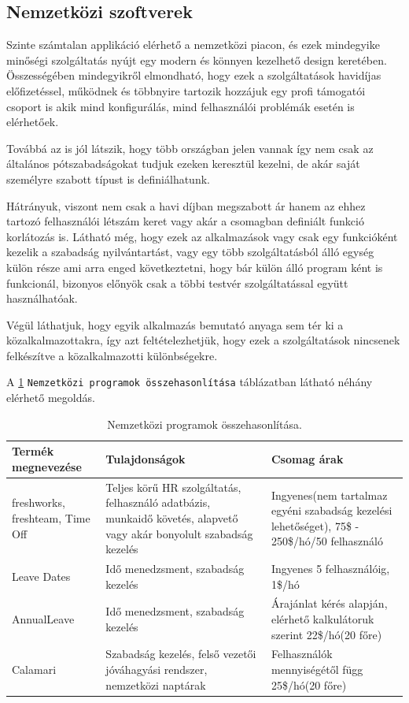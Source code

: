 \subsection{Nemzetközi szoftverek}

Szinte számtalan applikáció elérhető a nemzetközi piacon, és ezek mindegyike minőségi szolgáltatás nyújt egy modern és könnyen kezelhető design keretében. Összességében mindegyikről elmondható, hogy ezek a szolgáltatások havidíjas előfizetéssel, működnek és többnyire tartozik hozzájuk egy profi támogatói csoport is akik mind konfigurálás, mind felhasználói problémák esetén is elérhetőek. 

Továbbá az is jól látszik, hogy több országban jelen vannak így nem csak az általános pótszabadságokat tudjuk ezeken keresztül kezelni, de akár saját személyre szabott típust is definiálhatunk.

Hátrányuk, viszont nem csak a havi díjban megszabott ár hanem az ehhez tartozó felhasználói létszám keret vagy akár a csomagban definiált funkció korlátozás is. Látható még, hogy ezek az alkalmazások vagy csak egy funkcióként kezelik a szabadság nyilvántartást, vagy egy több szolgáltatásból álló egység külön része ami arra enged következtetni, hogy bár külön álló program ként is funkcionál, bizonyos előnyök csak a többi testvér szolgáltatással együtt használhatóak.

Végül láthatjuk, hogy egyik alkalmazás bemutató anyaga sem tér ki a közalkalmazottakra, így azt feltételezhetjük, hogy ezek a szolgáltatások nincsenek felkészítve a közalkalmazotti különbségekre.

A \ref{tab:nemzetközi programok} \texttt{Nemzetközi programok összehasonlítása} táblázatban látható néhány elérhető megoldás.

\begin{table}[h]
	\centering
	\caption{Nemzetközi programok összehasonlítása.}
	\label{tab:nemzetközi programok}
	\begin{tabular}{|>{\centering\arraybackslash}m{3cm}|>{\centering\arraybackslash}m{5.5cm}|>{\centering\arraybackslash}m{5.5cm}|}
		\hline
		Termék megnevezése & Tulajdonságok & Csomag árak \\
		\hline
		freshworks, freshteam, Time Off\cite{freshworkswebsite} & Teljes körű HR szolgáltatás, felhasználó adatbázis, munkaidő követés, alapvető vagy akár bonyolult szabadság kezelés   & Ingyenes(nem tartalmaz egyéni szabadság kezelési lehetőséget), 75\$ - 250\$/hó/50 felhasználó \\
		\hline
		Leave Dates\cite{leavedateswebsite} & Idő menedzsment, szabadság kezelés  & Ingyenes 5 felhasználóig, 1\$/hó \\
		\hline
		AnnualLeave\cite{annualleavewebsite} & Idő menedzsment, szabadság kezelés  & Árajánlat kérés alapján, elérhető kalkulátoruk szerint 22\$/hó(20 főre) \\
		\hline
		Calamari\cite{calamariwebsite} & Szabadság kezelés, felső vezetői jóváhagyási rendszer, nemzetközi naptárak  & Felhasználók mennyiségétől függ 25\$/hó(20 főre) \\
		\hline
	\end{tabular}
\end{table}

